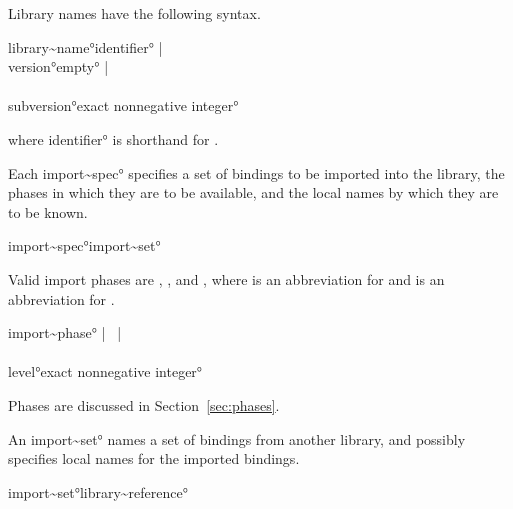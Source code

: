 \documentclass{monograph}
\begin{document}
Library names have the following syntax.

\begin{grammar}
\ang{library~name}\longis \ang{identifier} \bar\ 
\\
\ang{version}\longis \ang{empty} \bar\ \\
\\
\ang{subversion}\longis \ang{exact nonnegative integer}
\end{grammar}

where \ang{identifier} is shorthand for .

Each \ang{import~spec} specifies a set of bindings to be imported into
the library, the phases in which they are to be available, and the local
names by which they are to be known.

\begin{grammar}
\ang{import~spec}\longis \ang{import~set}\\
  \orbar {}
\end{grammar}

Valid import phases are , , and
, where  is an abbreviation for
 and  is an abbreviation for
.

\begin{grammar}
\ang{import~phase}\longis {} \bar\  \bar\ \\
\\
\ang{level}\longis \ang{exact nonnegative integer}
\end{grammar}

Phases are discussed in Section~\ref{sec:phases}.

An \ang{import~set} names a set of bindings from another library, and
possibly specifies local names for the imported bindings.

\begin{grammar}
\ang{import~set}\longis \ang{library~reference}\\
  \orbar {}\\
  \orbar {}\\
  \orbar {}\\
  \orbar {}
\end{grammar}
\end{document}
